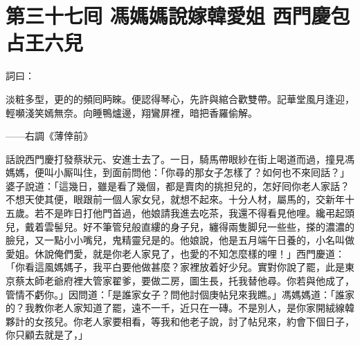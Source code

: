 
\chapter*{第三十七囘 馮媽媽說嫁韓愛姐 西門慶包占王六兒}


詞曰：

淡粧多型，更的的頻囘眄睞。便認得琴心，先許與綰合歡雙帶。記華堂風月逢迎，輕嚬淺笑嫣無奈。向睡鴨爐邊，翔鸞屏裡，暗把香羅偷解。

——右調《薄倖前》

話說西門慶打發蔡狀元、安進士去了。一日，騎馬帶眼紗在街上喝道而過，撞見馮媽媽，便叫小厮叫住，到面前問他：「你尋的那女子怎樣了？如何也不來囘話？」婆子說道：「這幾日，雖是看了幾個，都是賣肉的挑担兒的，怎好囘你老人家話？不想天使其便，眼跟前一個人家女兒，就想不起來。十分人材，屬馬的，交新年十五歲。若不是昨日打他門首過，他娘請我進去吃茶，我還不得看見他哩。纔弔起頭兒，戴着雲髻兒。好不筆管兒般直縷的身子兒，纏得兩隻脚兒一些些，搽的濃濃的臉兒，又一點小小嘴兒，鬼精靈兒是的。他娘說，他是五月端午日養的，小名叫做愛姐。休說俺們愛，就是你老人家見了，也愛的不知怎麼樣的哩！」西門慶道：「你看這風媽媽子，我平白要他做甚麼？家裡放着好少兒。實對你說了罷，此是東京蔡太師老爺府裡大管家翟爹，要做二房，圖生長，托我替他尋。你若與他成了，管情不虧你。」因問道：「是誰家女子？問他討個庚帖兒來我瞧。」馮媽媽道：「誰家的？我教你老人家知道了罷，遠不一千，近只在一磚。不是別人，是你家開絨線韓夥計的女孩兒。你老人家要相看，等我和他老子說，討了帖兒來，約會下個日子，你只顧去就是了，」

